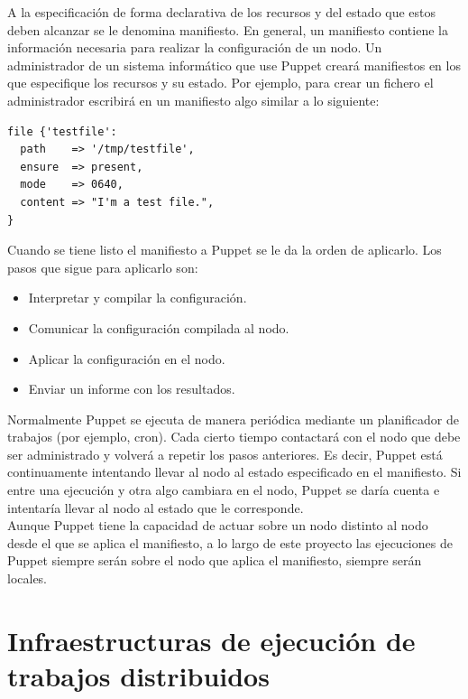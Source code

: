 A la especificación de forma declarativa de los recursos y del estado que estos deben alcanzar se le denomina manifiesto. En general, un manifiesto contiene la información necesaria para realizar la configuración de un nodo. Un administrador de un sistema informático que use Puppet creará manifiestos en los que especifique los recursos y su estado. Por ejemplo, para crear un fichero el administrador escribirá en un manifiesto algo similar a lo siguiente:


\begin{lstlisting}
file {'testfile':
  path    => '/tmp/testfile',
  ensure  => present,
  mode    => 0640,
  content => "I'm a test file.",
}
\end{lstlisting}

Cuando se tiene listo el manifiesto a Puppet se le da la orden de aplicarlo. Los pasos que sigue para aplicarlo son:

\begin{itemize}
\item Interpretar y compilar la configuración.
\item Comunicar la configuración compilada al nodo.
\item Aplicar la configuración en el nodo.
\item Enviar un informe con los resultados.
\end{itemize}


Normalmente Puppet se ejecuta de manera periódica mediante un planificador de trabajos (por ejemplo, cron). Cada cierto tiempo contactará con el nodo que debe ser administrado y volverá a repetir los pasos anteriores. Es decir, Puppet está continuamente intentando llevar al nodo al estado especificado en el manifiesto. Si entre una ejecución y otra algo cambiara en el nodo, Puppet se daría cuenta e intentaría llevar al nodo al estado que le corresponde. \\

Aunque Puppet tiene la capacidad de actuar sobre un nodo distinto al nodo desde el que se aplica el manifiesto, a lo largo de este proyecto las ejecuciones de Puppet siempre serán sobre el nodo que aplica el manifiesto, siempre serán locales.


\section{Infraestructuras de ejecución de trabajos distribuidos}

